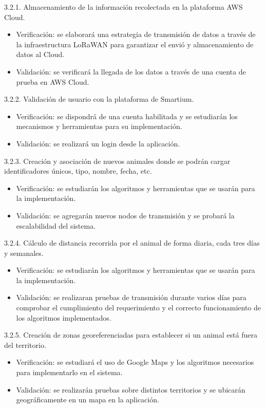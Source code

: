 \documentclass[11pt]{charter}
\begin{document}
3.2.1. Almacenamiento de la información recolectada en la plataforma AWS Cloud. 
\begin{itemize}
	\item Verificación: se elaborará una estrategia de transmisión de datos a través de la infraestructura LoRaWAN para garantizar el envió y almacenamiento de datos al Cloud. 
	\item Validación: se verificará la llegada de los datos a través de una cuenta de prueba en AWS Cloud. 
\end{itemize}

3.2.2. Validación de usuario con la plataforma de Smartium.
\begin{itemize}
	\item Verificación: se dispondrá de una cuenta habilitada y se estudiarán los mecanismos y herramientas para su implementación. 
	\item Validación: se realizará un login desde la aplicación. 
\end{itemize}

3.2.3. Creación y asociación de nuevos animales donde se podrán cargar identificadores únicos, tipo, nombre, fecha, etc. 
\begin{itemize}
	\item Verificación: se estudiarán los algoritmos y herramientas que se usarán para la implementación. 
	\item Validación: se agregarán nuevos nodos de transmisión y se probará la escalabilidad del sistema. 
\end{itemize}

3.2.4. Cálculo de distancia recorrida por el animal de forma diaria, cada tres días y semanales. 
\begin{itemize}
	\item Verificación: se estudiarán los algoritmos y herramientas que se usarán para la implementación. 
	\item Validación: se realizaran pruebas de transmisión durante varios días para comprobar el cumplimiento del requerimiento y el correcto funcionamiento de los algoritmos implementados. 
\end{itemize}

3.2.5. Creación de zonas georeferenciadas para establecer si un animal está fuera del territorio. 
\begin{itemize}
	\item Verificación: se estudiará el uso de Google Maps y los algoritmos necesarios para implementarlo en el sistema. 
	\item Validación: se realizarán pruebas sobre distintos territorios y se ubicarán geográficamente en un mapa en la aplicación. 
\end{itemize}
\end{document}
